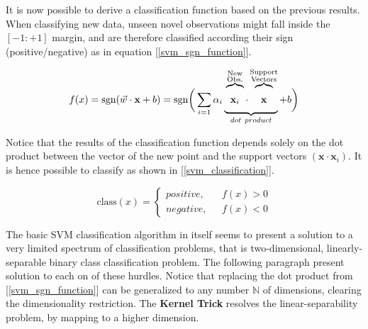 	It is now possible to derive a classification function based on the previous results. When classifying new data, unseen novel observations might fall inside the $[-1:+1]$ margin, and are therefore classified according their sign (positive/negative) as in equation [\ref{svm_sgn_function}].
	
	\begin{equation}
		f(x) = \text{sgn}(\vec{w} \cdot \textbf{x} + b)  =
		\text{sgn}\bigg( \sum_{i=1} \alpha_i
		\xunderbrace{
		 \xoverbrace{\textbf{x}_i}^{\substack{\text{New}\\ \text{Obs.}}}
	  \cdot 
	  \xoverbrace{\textbf{x}}^{\substack{\text{Support}\\ \text{Vectors}}}
		}_{dot \ product}
		 + b \bigg)
		\label{svm_sgn_function} 
	\end{equation}
	
	Notice that the results of the classification function depends solely on the dot product between the vector of the new point and the support vectors $(\textbf{x} \cdot\textbf{x}_i)$. It is hence possible to classify as shown in [\ref{svm_classification}].
	
	\begin{equation}
		\text{class}(x) = 
		\begin{cases}
			positive,\ \ \  &f(x) > 0 \\
			negative,\ \ \  &f(x) < 0
		\end{cases}
		\label{svm_classification}
	\end{equation}
	
	The basic SVM classification algorithm in itself seems to present a solution to a very limited spectrum of classification problems, that is two-dimensional, linearly-separable binary class classification problem. The following paragraph present solution to each on of these hurdles. Notice that replacing the dot product from [\ref{svm_sgn_function}] can be generalized to any number $\mathbb{N}$ of dimensions, clearing the dimensionality restriction. The \textbf{Kernel Trick} resolves the linear-separability problem, by mapping to a higher dimension.
		
	\par		
